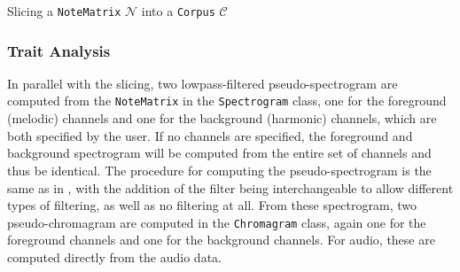 \begin{algorithm}[h!]
\caption{Slicing a \texttt{NoteMatrix} $\mathcal N$ into a \texttt{Corpus} $\mathcal C$}
\begin{algorithmic}[1]\label{eq:4-slicing}
			\label{lst:4-slicing-concat}
		\ELSE
		\ENDIF
	\ENDFOR
\end{algorithmic}
\end{algorithm}

\subsubsection{Trait Analysis}\label{sec:4-corpus-builder-trait}
In parallel with the slicing, two lowpass-filtered pseudo-spectrogram are computed  from the \texttt{NoteMatrix} in the \texttt{Spectrogram} class, one for the foreground (melodic) channels and one for the background (harmonic) channels, which are both specified by the user. If no channels are specified, the foreground and background spectrogram will be computed from the entire set of channels and thus be identical. The procedure for computing the pseudo-spectrogram is the same as in \cite{borg_2019}, with the addition of the filter being interchangeable to allow different types of filtering, as well as no filtering at all. From these spectrogram, two pseudo-chromagram are computed in the \texttt{Chromagram} class, again one for the foreground channels and one for the background channels. For audio, these are computed directly from the audio data.

